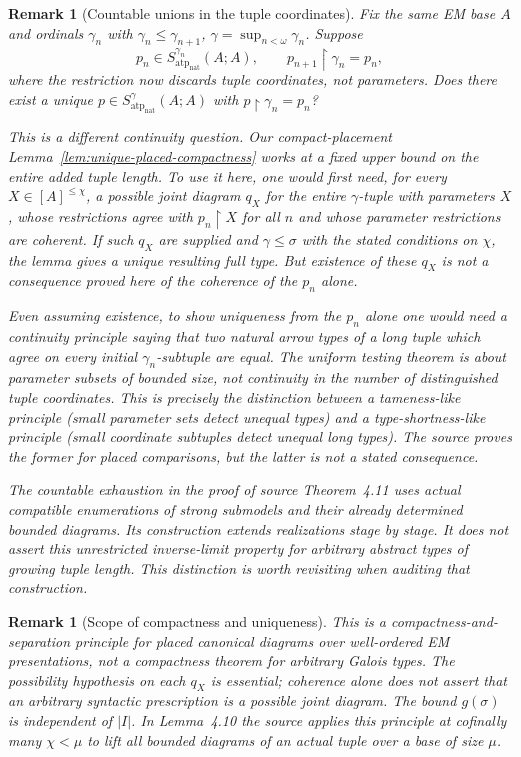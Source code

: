 \documentclass[11pt]{article}
\newcommand{\natatp}{\operatorname{atp}_{\mathrm{nat}}}
\theoremstyle{plain}
\newtheorem{remark}[definition]{Remark}
\begin{document}
\begin{remark}[Countable unions in the tuple coordinates]
\label{rem:long-tuple-union}
Fix the same EM base $A$ and ordinals
$\gamma_n$ with $\gamma_n\leq\gamma_{n+1}$,
$\gamma=\sup_{n<\omega}\gamma_n$.
Suppose
\[
p_n\in S^{\gamma_n}_{\natatp}(A;A),
\qquad
p_{n+1}\restriction\gamma_n=p_n,
\]
where the restriction now discards \emph{tuple
coordinates}, not parameters. Does there
exist a unique
$p\in S^\gamma_{\natatp}(A;A)$
with $p\restriction\gamma_n=p_n$?

This is a different continuity question.
Our compact-placement Lemma~\ref{lem:unique-placed-compactness}
works at a \emph{fixed} upper bound on
the entire added tuple length. To use it
here, one would first need, for every
$X\in[A]^{\leq\chi}$, a \emph{possible}
joint diagram $q_X$ for the entire
$\gamma$-tuple with parameters $X$,
whose restrictions agree with
$p_n\restriction X$ for all $n$ and
whose parameter restrictions are coherent.
If such $q_X$ are supplied and
$\gamma\leq\sigma$ with the stated
conditions on $\chi$, the lemma gives
a unique resulting \emph{full} type.
But existence of these $q_X$ is not
a consequence proved here of the
coherence of the $p_n$ alone.

Even assuming existence, to show uniqueness
\emph{from the $p_n$ alone} one would need
a continuity principle saying that
two natural arrow types of a long tuple
which agree on every initial
$\gamma_n$-subtuple are equal.
The uniform testing theorem is about
\emph{parameter subsets} of bounded size,
not continuity in the number of
distinguished tuple coordinates.
This is precisely the distinction between
a \emph{tameness-like} principle (small
parameter sets detect unequal types)
and a \emph{type-shortness-like} principle
(small coordinate subtuples detect
unequal long types). The source proves
the former for placed comparisons, but
the latter is not a stated consequence.

The countable exhaustion in the proof of
source Theorem~4.11 uses \emph{actual
compatible enumerations} of strong
submodels and their already determined
bounded diagrams. Its construction
extends realizations stage by stage.
It does not assert this unrestricted
inverse-limit property for arbitrary
abstract types of growing tuple length.
This distinction is worth revisiting
when auditing that construction.
\end{remark}

\begin{remark}[Scope of compactness and uniqueness]
This is a compactness-and-separation principle for
\emph{placed canonical diagrams over well-ordered
EM presentations}, not a compactness theorem for
arbitrary Galois types. The possibility hypothesis
on each $q_X$ is essential; coherence alone does
not assert that an arbitrary syntactic prescription
is a possible joint diagram. The bound $g(\sigma)$
is independent of $|I|$. In Lemma~4.10 the source
applies this principle at cofinally many
$\chi<\mu$ to lift all bounded diagrams of an
actual tuple over a base of size $\mu$.
\end{remark}
\end{document}
